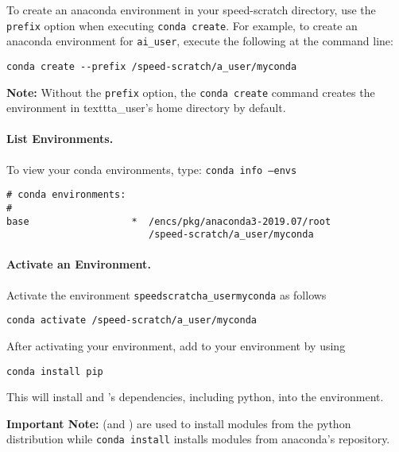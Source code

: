 \documentclass{easychair}
\begin{document}
To create an anaconda environment in your speed-scratch directory, use the \texttt{\-\-prefix} 
option when executing \texttt{conda create}. For example, to create an anaconda environment for 
\texttt{ai\_user}, execute the following at the command line:

\begin{verbatim}
conda create --prefix /speed-scratch/a_user/myconda
\end{verbatim}

\vspace{10pt}
\noindent
\textbf{Note:} Without the \texttt{\-\-prefix} option, the \texttt{conda create} command creates the 
environment in texttt{a\_user}'s home directory by default.
\vspace{10pt}

\paragraph{List Environments.}

To view your conda environments, type: \texttt{conda info --envs}

\begin{verbatim}
# conda environments:
#
base                  *  /encs/pkg/anaconda3-2019.07/root
                         /speed-scratch/a_user/myconda
\end{verbatim}      

\paragraph{Activate an Environment.}

Activate the environment \texttt{\/speed\-scratch\/a\_user\/myconda} as follows
\begin{verbatim}
conda activate /speed-scratch/a_user/myconda
\end{verbatim}
After activating your environment, add  to your environment by using 
\begin{verbatim}
conda install pip
\end{verbatim}
This will install  and 's dependencies, including python, 
into the environment.

\vspace{10pt}
\noindent
\textbf{Important Note:}  (and ) are used to install modules
 from the python distribution while \texttt{conda install} installs modules from 
 anaconda's repository.
\vspace{10pt}
\end{document}
